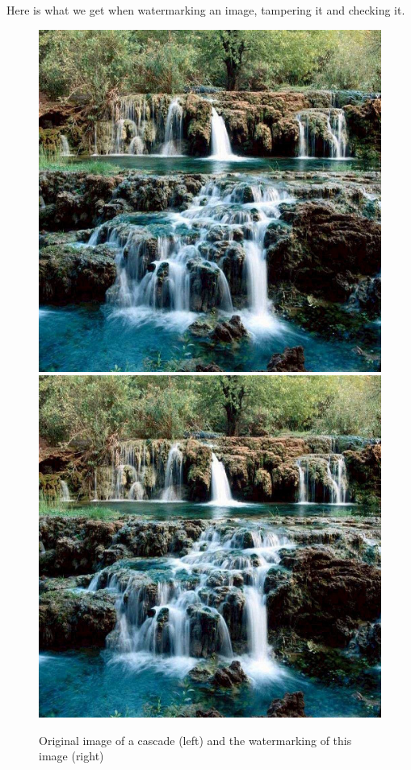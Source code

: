 \documentclass[11pt, oneside]{article}   	%
\begin{document}
Here is what we get when watermarking an image, tampering it and checking it. \newpage
			\begin{figure}[h]
			\begin{center}
				\includegraphics[scale=0.34]{images_png/image0.jpg}
				\includegraphics[scale=0.34]{images_png/image0.jpg}
			\end{center}
			\caption{Original image of a cascade (left) and the watermarking of this image (right)}
			\end{figure}
\end{document}
